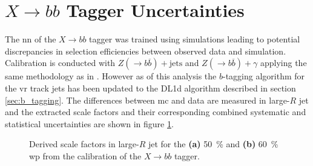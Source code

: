 \section{$X\rightarrow bb$ Tagger Uncertainties}
The \ac{nn} of the $X\rightarrow bb$ tagger was trained using simulations leading to potential discrepancies in selection efficiencies between observed data and simulation. Calibration is conducted with $Z(\rightarrow b\overline{b})+\text{jets}$ and $Z(\rightarrow b\overline{b})+\gamma$ applying the same methodology as in \citep{ATL-PHYS-PUB-2021-035}. However as of this analysis the $b$-tagging algorithm for the \ac{vr} track jets has been updated to the DL1d algorithm described in section \ref{sec:b_tagging}. The differences between \ac{mc} and data are measured in large-$R$ jet \pt and the extracted scale factors and their corresponding combined systematic and statistical uncertainties are shown in figure \ref{fig:xbb_sf}.
\begin{figure}
    \centering
    \caption[]{Derived scale factors in large-$R$ jet \pt for the \textbf{(a)} \qty[]{50}{\percent} and \textbf{(b)} \qty[]{60}{\percent} \ac{wp} from the calibration of the $X\rightarrow bb$ tagger.}
    \label{fig:xbb_sf}
\end{figure}

